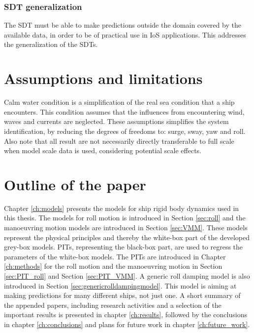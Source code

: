 \subsubsection*{SDT generalization}
The SDT must be able to make predictions outside the domain covered by the available data, in order to be of practical use in IoS applications. This addresses the generalization of the SDTs.

\section{Assumptions and limitations}
Calm water condition is a simplification of the real sea condition that a ship encounters. This condition assumes that the influences from encountering wind, waves and currents are neglected. These assumptions simplifies the system identification, by reducing the degrees of freedoms to: surge, sway, yaw and roll. Also note that all result are not necessarily directly transferable to full scale when model scale data is used, considering potential scale effects. 

\section{Outline of the paper}
Chapter \ref{ch:models} presents the models for ship rigid body dynamics used in this thesis. The models for roll motion is introduced in Section \ref{sec:roll} and the manoeuvring motion models are introduced in Section \ref{sec:VMM}. These models represent the physical principles and thereby the white-box part of the developed grey-box models.
PITs, representing the black-box part, are used to regress the parameters of the white-box models. The PITs are introduced in Chapter \ref{ch:methods} for the roll motion and the manoeuvring motion in Section \ref{sec:PIT_roll} and Section \ref{sec:PIT_VMM}. 
A generic roll damping model is also introduced in Section \ref{sec:genericrolldampingmodel}. This model is aiming at making predictions for many different ships, not just one.
A short summary of the appended papers, including research activities and a selection of the important results is presented in chapter \ref{ch:results}, followed by the conclusions in chapter \ref{ch:conclusions} and plans for future work in chapter \ref{ch:future_work}.






